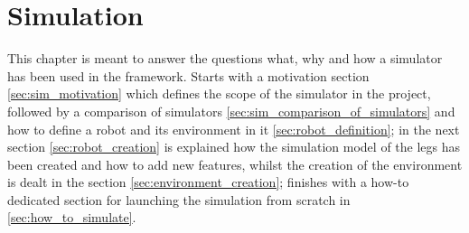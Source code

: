 
\chapter{Simulation} %
\label{cha:simulation}
This chapter is meant to answer the questions what, why and how a simulator has been used in the framework.
Starts with a motivation section \ref{sec:sim_motivation} which defines the scope of the simulator
 in the project, followed by a comparison of simulators \ref{sec:sim_comparison_of_simulators} and how to define a robot and its environment in it \ref{sec:robot_definition}; in the next section \ref{sec:robot_creation} is explained how the simulation model of the legs has been created and how to add new features, whilst the creation of the environment is dealt in the section \ref{sec:environment_creation}; finishes with a how-to dedicated section for launching the simulation from scratch in \ref{sec:how_to_simulate}.







